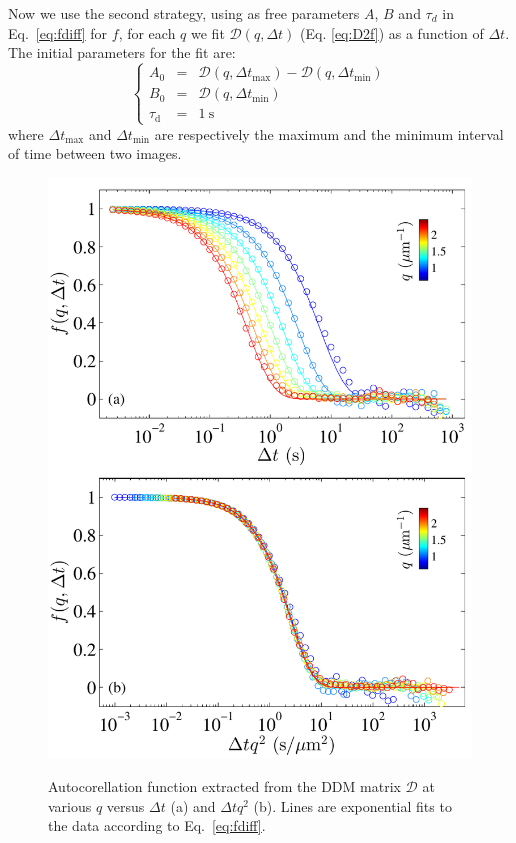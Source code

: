 \documentclass[prb,reprint,amsmath,amssymb]{revtex4-1}
\newcommand{\tg}[1]{{\color{magenta}#1}} %
\begin{document}
Now we use the second strategy, using as free parameters $A$, $B$ and $\tau_d$ in Eq.~\eqref{eq:fdiff} for $f$, for each $q$ we fit $\mathcal{D}(q, \Delta t)$ (Eq. \eqref{eq:D2f}) as a function of $\Delta t$. The initial parameters for the fit are:
\begin{equation}
\left\{
\begin{array}{rcl}
A_0 &=& \mathcal{D} (q,\Delta t_\text{max}) - \mathcal{D} (q,\Delta t_\text{min}) \\
B_0 &=& \mathcal{D} (q,\Delta t_\text{min}) \\
\tau_\text{d} &=& \SI{1}{\second}
\end{array}
\right.
\end{equation}
where $\Delta t_\text{max}$ and $\Delta t_\text{min}$ are respectively the maximum and the minimum interval of time between two images.

\begin{figure}
	\includegraphics[width=\linewidth]{ISFColloides.pdf}\\
	\caption{\tg{Autocorellation function extracted from the DDM matrix $\mathcal{D}$} at various $q$ versus $\Delta t$ (a) and $\Delta tq^2$ (b). Lines are exponential fits to the data according to Eq.~\ref{eq:fdiff}.}
	\label{fig:ISF}
\end{figure}
\end{document}
